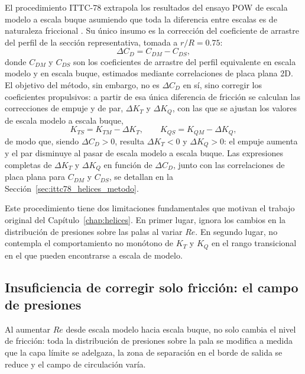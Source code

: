 El procedimiento ITTC-78
extrapola los resultados del ensayo POW de escala modelo a escala buque asumiendo que toda la diferencia entre escalas es de naturaleza friccional \citep{ITTC_Performance_prediction}. Su único insumo es la corrección del coeficiente de arrastre del perfil de la sección representativa, tomada a $r/R = 0.75$:
%
\begin{equation}
    \Delta C_D = C_{DM} - C_{DS},
\end{equation}
%
donde $C_{DM}$ y $C_{DS}$ son los coeficientes de arrastre del perfil equivalente en escala modelo y en escala buque, estimados mediante correlaciones de placa plana 2D. El objetivo del método, sin embargo, no es $\Delta C_D$ en sí, sino corregir los coeficientes propulsivos: a partir de esa única diferencia de fricción se calculan las correcciones de empuje y de par, $\Delta K_T$ y $\Delta K_Q$, con las que se ajustan los valores de escala modelo a escala buque,
%
\begin{equation}
    K_{TS} = K_{TM} - \Delta K_T, \qquad K_{QS} = K_{QM} - \Delta K_Q,
    \label{eq:ittc78_correcciones}
\end{equation}
%
de modo que, siendo $\Delta C_D > 0$, resulta $\Delta K_T < 0$ y $\Delta K_Q > 0$: el empuje aumenta y el par disminuye al pasar de escala modelo a escala buque. Las expresiones completas de $\Delta K_T$ y $\Delta K_Q$ en función de $\Delta C_D$, junto con las correlaciones de placa plana para $C_{DM}$ y $C_{DS}$, se detallan en la Sección~\ref{sec:ittc78_helices_metodo}.
 
Este procedimiento tiene dos limitaciones fundamentales que motivan el trabajo original del Capítulo~\ref{chap:helices}. En primer lugar, ignora los cambios en la distribución de presiones sobre las palas al variar $Re$. En segundo lugar, no contempla el comportamiento no monótono de $K_T$ y $K_Q$ en el rango transicional en el que pueden encontrarse a escala de modelo.
 
\subsection{Insuficiencia de corregir solo fricción: el campo de presiones}
\label{sec:presion_escala}

Al aumentar $Re$ desde escala modelo hacia escala buque, no solo cambia el nivel
de fricción: toda la distribución de presiones sobre la pala se modifica a medida
que la capa límite se adelgaza, la zona de separación en el borde de salida se
reduce y el campo de circulación varía.

